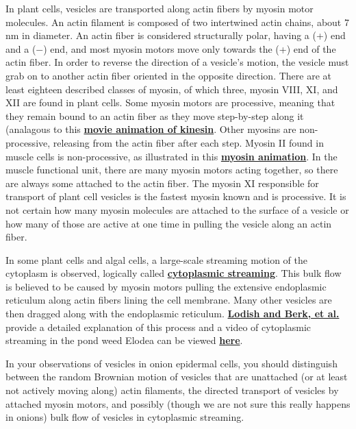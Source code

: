 \documentclass{../lab}
\begin{document}
In plant cells, vesicles are transported along actin fibers by myosin motor molecules. An actin filament is composed of two intertwined actin chains, about 7 nm in diameter. An actin fiber is considered structurally polar, having a (+) end and a ($-$) end, and most myosin motors move only towards the (+) end of the actin fiber. In order to reverse the direction of a vesicle's motion, the vesicle must grab on to another actin fiber oriented in the opposite direction. There are at least eighteen described classes of myosin, of which three, myosin VIII, XI, and XII are found in plant cells. Some myosin motors are processive, meaning that they remain bound to an actin fiber as they move step-by-step along it (analagous to this \href{http://experimentationlab.berkeley.edu/sites/default/files/motionbykinesin.mp4}{\textbf{movie animation of kinesin}}. Other myosins are non-processive, releasing from the actin fiber after each step. Myosin II found in muscle cells is non-processive, as illustrated in this \href{http://physics111.lib.berkeley.edu/Physics111/Reprints/OTZ/actinmyosin.gif}{\textbf{myosin animation}}. In the muscle functional unit, there are many myosin motors acting together, so there are always some attached to the actin fiber. The myosin XI responsible for transport of plant cell vesicles is the fastest myosin known and is processive. It is not certain how many myosin molecules are attached to the surface of a vesicle or how many of those are active at one time in pulling the vesicle along an actin fiber.

In some plant cells and algal cells, a large-scale streaming motion of the cytoplasm is observed, logically called \href{http://physics111.lib.berkeley.edu/Physics111/Reprints/OTZ/biowikipedia.pdf}{\textbf{cytoplasmic streaming}}. This bulk flow is believed to be caused by myosin motors pulling the extensive endoplasmic reticulum along actin fibers lining the cell membrane. Many other vesicles are then dragged along with the endoplasmic reticulum. \href{http://physics111.lib.berkeley.edu/Physics111/Reprints/OTZ/Cytoplasmicstreaming.pdf}{\textbf{Lodish and Berk, et al.}} provide a detailed explanation of this process and a video of cytoplasmic streaming in the pond weed Elodea can be viewed \href{http://experimentationlab.berkeley.edu/sites/default/files/Cytoplasmic_Streaming_Elodea.mov}{\textbf{here}}.

In your observations of vesicles in onion epidermal cells, you should distinguish between the random Brownian motion of vesicles that are unattached (or at least not actively moving along) actin filaments, the directed transport of vesicles by attached myosin motors, and possibly (though we are not sure this really happens in onions) bulk flow of vesicles in cytoplasmic streaming.
\end{document}
